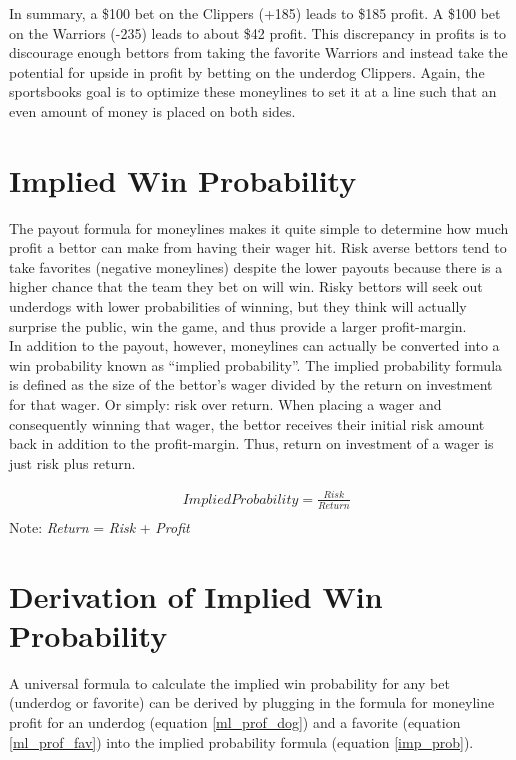 \documentclass [MS] {uclathes}
\begin{document}
\noindent In summary, a \$100 bet on the Clippers (+185) leads to \$185 profit. A \$100 bet on the Warriors (-235) leads to about \$42 profit. This discrepancy in profits is to discourage enough bettors from taking the favorite Warriors and instead take the potential for upside in profit by betting on the underdog Clippers. Again, the sportsbooks goal is to optimize these moneylines to set it at a line such that an even amount of money is placed on both sides. \\

\section{Implied Win Probability}
The payout formula for moneylines makes it quite simple to determine how much profit a bettor can make from having their wager hit. Risk averse bettors tend to take favorites (negative moneylines) despite the lower payouts because there is a higher chance that the team they bet on will win. Risky bettors will seek out underdogs with lower probabilities of winning, but they think will actually surprise the public, win the game, and thus provide a larger profit-margin. \\

\noindent In addition to the payout, however, moneylines can actually be converted into a win probability known as ``implied probability''. The implied probability formula is defined as the size of the bettor's wager divided by the return on investment for that wager. Or simply: risk over return. When placing a wager and consequently winning that wager, the bettor receives their initial risk amount back in addition to the profit-margin. Thus, return on investment of a wager is just risk plus return.

\begin{equation} \label{imp_prob}
\begin{split}
& Implied Probability = \frac{Risk}{Return}  \\
\end{split}
\end{equation}
Note: \emph{Return} = \emph{Risk} + \emph{Profit}

\section{Derivation of Implied Win Probability}
A universal formula to calculate the implied win probability for any bet (underdog or favorite) can be derived by plugging in the formula for moneyline profit for an underdog (equation \ref{ml_prof_dog}) and a favorite (equation \ref{ml_prof_fav}) into the implied probability formula (equation \ref{imp_prob}).
\end{document}
